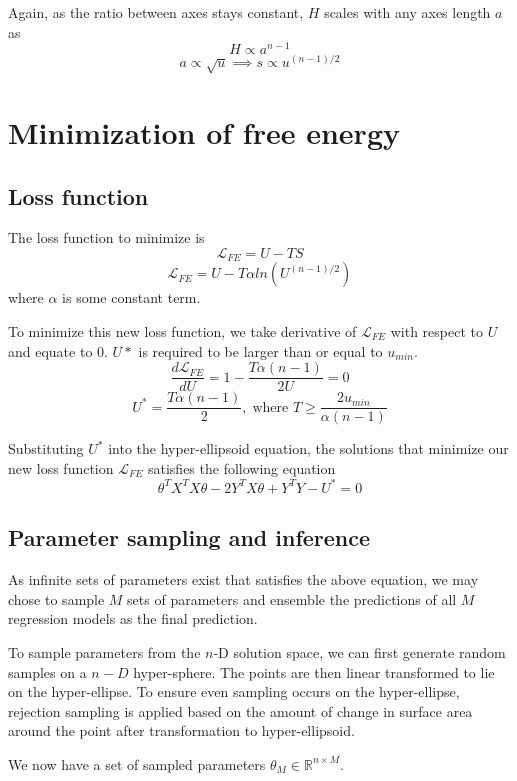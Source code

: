 \documentclass{article}
\begin{document}
Again, as the ratio between axes stays constant, $H$ scales with any axes length $a$ as
\[
H \propto a^{n-1}
\]
\[
a \propto \sqrt{u} \implies s \propto u^{(n-1)/2}
\]

\section{Minimization of free energy}
\subsection{Loss function}
The loss function to minimize is
\[
\mathcal{L}_{FE} = U - TS
\]
\[
\mathcal{L}_{FE} = U - T\alpha ln\left(U^{(n-1)/2}\right)
\]
where $\alpha$ is some constant term.

To minimize this new loss function, we take derivative of $\mathcal{L}_{FE}$ with respect to $U$ and equate to 0. $U*$ is required to be larger than or equal to $u_{min}$. 
\[
\frac{d\mathcal{L}_{FE}}{dU} = 1 - \frac{T\alpha(n-1)}{2U} = 0
\]
\[
U^* = \frac{T\alpha(n-1)}{2}, \; \text{where } T \geq \frac{2u_{min}}{\alpha (n-1)}
\]

Substituting $U^*$ into the hyper-ellipsoid equation, the solutions that minimize our new loss function $\mathcal{L}_{FE}$ satisfies the following equation
\[
\theta^T X^T X\theta - 2Y^T X\theta + Y^T Y - U^* = 0
\]

\subsection{Parameter sampling and inference}
As infinite sets of parameters exist that satisfies the above equation, we may chose to sample $M$ sets of parameters and ensemble the predictions of all $M$ regression models as the final prediction.

To sample parameters from the $n$-D solution space, we can first generate random samples on a $n-D$ hyper-sphere. The points are then linear transformed to lie on the hyper-ellipse. To ensure even sampling occurs on the hyper-ellipse, rejection sampling is applied based on the amount of change in surface area around the point after transformation to hyper-ellipsoid.

We now have a set of sampled parameters $\theta_{M} \in \mathbb{R}^{n \times M}$. 
\end{document}
